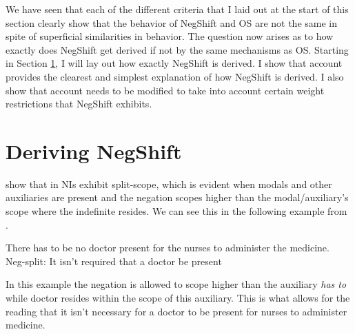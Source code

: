 \documentclass[12pt, letterpaper]{article}
\begin{document}
We have seen that each of the different criteria that I laid out at the start of this section clearly show that the behavior of NegShift and OS are not the same in spite of superficial similarities in behavior. The question now arises as to how exactly does NegShift get derived if not by the same mechanisms as OS. Starting in Section \ref{sec:DERIVING}, I will lay out how exactly NegShift is derived. I show that  account provides the clearest and simplest explanation of how NegShift is derived. I also show that  account needs to be modified to take into account certain weight restrictions that NegShift exhibits.

\section{Deriving NegShift} \label{sec:DERIVING}

\citet{iatridouNegativeDPsAMovement2011} show that in NIs exhibit split-scope, which is evident when modals and other auxiliaries are present and the negation scopes higher than the modal/auxiliary's scope where the indefinite resides. We can see this in the following example from \citet{iatridouNegativeDPsAMovement2011}. 

\ea There has to be no doctor present for the nurses to administer the medicine.\\
Neg-split: It isn’t required that a doctor be present
\z 

In this example the negation is allowed to scope higher than the auxiliary \emph{has to} while doctor resides within the scope of this auxiliary. This is what allows for the reading that it isn't necessary for a doctor to be present for nurses to administer medicine. 
\end{document}
